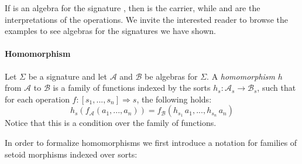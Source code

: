 \noindent If  is an algebra for the signature , then
  is the carrier, while 
  and
 are the interpretations
of the operations. We invite the interested reader to browse the examples to
see algebras for the signatures we have shown.

\paragraph*{Homomorphism}
Let $\Sigma$ be a signature and let $\mathcal{A}$ and $\mathcal{B}$ be
algebras for $\Sigma$. A \emph{homomorphism} $h$ from $\mathcal{A}$ to
$\mathcal{B}$ is a family of functions indexed by the sorts
$h_s : \mathcal{A}_s \rightarrow \mathcal{B}_s$, such that for each
operation $f : [s_1,...,s_n] \Rightarrow s$, the following holds:
\begin{equation}
  h_s(f_{\mathcal{A}}(a_1,...,a_n)) = f_{\mathcal{B}}(h_{s_1}\,a_1,...,h_{s_n}\,a_n)\label{eq:homcond}
\end{equation}
\noindent Notice that this is a condition over the family of
functions.

In order to formalize homomorphisms we first introduce a
notation for families of setoid morphisms indexed over sorts:


\begin{code}
\>[0]\AgdaSpace{}%
\AgdaSymbol{:}\AgdaSpace{}%
\AgdaSpace{}%
\AgdaSymbol{\{}\AgdaSymbol{\}}\AgdaSpace{}%
\AgdaSpace{}%
\AgdaSpace{}%
\AgdaSpace{}%
\AgdaSpace{}%
\AgdaSpace{}%
\AgdaSpace{}%
\AgdaSpace{}%
\<%
\\
\>[0]\AgdaSpace{}%
\AgdaSymbol{\{}\AgdaSymbol{\}}\AgdaSpace{}%
\AgdaSpace{}%
\AgdaSpace{}%
\AgdaSymbol{=}\AgdaSpace{}%
\AgdaSymbol{(}\AgdaSpace{}%
\AgdaSymbol{:}\AgdaSpace{}%
\AgdaSpace{}%
\AgdaSymbol{)}\AgdaSpace{}%
\AgdaSpace{}%
\AgdaSpace{}%
\AgdaSpace{}%
\AgdaSpace{}%
\AgdaSpace{}%
\AgdaSpace{}%
\AgdaSpace{}%
\AgdaSpace{}%
\AgdaSpace{}%
\<%
\end{code}


